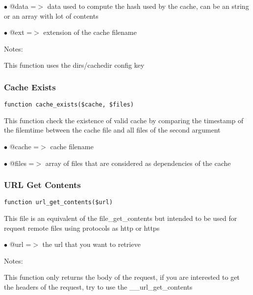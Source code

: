 \documentclass[a4paper]{article}
\begin{document}
\begin{compactitem}
\item[\color{myblue}$\bullet$] @data =$>$ data used to compute the hash used by the cache, can be an string or
         an array with lot of contents
\item[\color{myblue}$\bullet$] @ext  =$>$ extension of the cache filename
\end{compactitem}

Notes:

This function uses the dirs/cachedir config key

\hypertarget{toc131}{}
\subsubsection{Cache Exists}

\begin{lstlisting}
function cache_exists($cache, $files)
\end{lstlisting}

This function check the existence of valid cache by comparing the timestamp
of the filemtime between the cache file and all files of the second argument

\begin{compactitem}
\item[\color{myblue}$\bullet$] @cache =$>$ cache filename
\item[\color{myblue}$\bullet$] @files =$>$ array of files that are considered as dependencies of the cache
\end{compactitem}

\hypertarget{toc132}{}
\subsubsection{URL Get Contents}

\begin{lstlisting}
function url_get_contents($url)
\end{lstlisting}

This file is an equivalent of the file\_get\_contents but intended to be used
for request remote files using protocols as http or https

\begin{compactitem}
\item[\color{myblue}$\bullet$] @url =$>$ the url that you want to retrieve
\end{compactitem}

Notes:

This function only returns the body of the request, if you are interested
to get the headers of the request, try to use the \_\_url\_get\_contents
\end{document}

